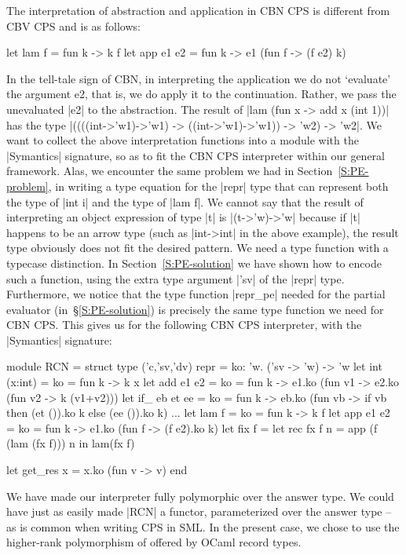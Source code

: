 \documentclass[preprint]{sigplanconf}
\begin{document}
The interpretation of abstraction and application in CBN CPS is
different from CBV CPS and is as follows:
\begin{code}
let lam f = fun k -> k f
let app e1 e2 = fun k -> e1 (fun f -> (f e2) k)
\end{code}
In the tell-tale sign of CBN, in interpreting the application
we do not `evaluate' the argument e2, that is, we do apply it to the
continuation. Rather, we pass the unevaluated |e2| to the abstraction.
The result of |lam (fun x -> add x (int 1))| has the type
|((((int->'w1)->'w1) -> ((int->'w1)->'w1)) -> 'w2) -> 'w2|.
We want to collect the above interpretation functions into a module
with the |Symantics| signature, so as to fit the CBN CPS interpreter within our
general framework. Alas, we encounter the same problem we had in
Section~\ref{S:PE-problem}, in writing a type equation for the |repr|
type that can represent both the type of |int i| and the type of 
|lam f|. We cannot say that the result of interpreting an object
expression of type |t| is |(t->'w)->'w| because if |t| happens to
be an arrow type (such as |int->int| in the above example), the result
type obviously does not fit the desired pattern. We need a type
function with a typecase distinction. In Section~\ref{S:PE-solution} we have
shown how to encode such a function, using the extra type
argument |'sv| of the |repr| type. Furthermore, we notice that the type 
function |repr_pe| needed for the partial evaluator 
(in~\S\ref{S:PE-solution}) is precisely the same type function we
need for CBN CPS. This gives us for the following CBN CPS interpreter,
with the |Symantics| signature:

\begin{code}
module RCN = struct
  type ('c,'sv,'dv) repr = 
     {ko: 'w. ('sv -> 'w) -> 'w}
  let int (x:int) = {ko = fun k -> k x}
  let add e1 e2 = 
    {ko = fun k -> e1.ko (fun v1 -> 
                   e2.ko (fun v2 -> k (v1+v2)))}
  let if_ eb et ee = 
    {ko = fun k -> eb.ko 
         (fun vb -> if vb then (et ()).ko k 
                    else (ee ()).ko k)}
  ...
  let lam f = {ko = fun k -> k f}
  let app e1 e2 = 
     {ko = fun k -> e1.ko (fun f -> (f e2).ko k)}
  let fix f = 
     let rec fx f n = app (f (lam (fx f))) n in 
     lam(fx f)

  let get_res x = x.ko (fun v -> v)
end
\end{code}

We have made our interpreter fully polymorphic over the answer type.
We could have just as easily made |RCN| a functor, parameterized over
the answer type -- as is common when writing CPS in SML. In the
present case, we chose to use the higher-rank polymorphism of offered by
OCaml record types.
\end{document}
